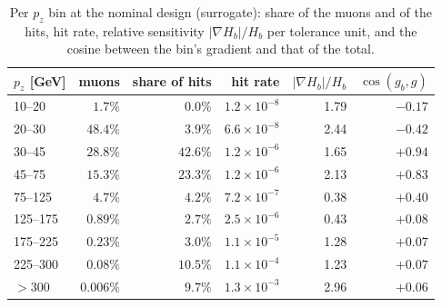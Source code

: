 \documentclass[11pt,a4paper]{article}
\begin{document}
\begin{table}[t]
\centering
\caption{Per $p_z$ bin at the nominal design (surrogate): share of the muons and of the hits, hit
rate, relative sensitivity $|\nabla H_b|/H_b$ per tolerance unit, and the cosine between the
bin's gradient and that of the total.}
\label{tab:pz}
\begin{tabular}{lrrrrr}
\toprule
$p_z$ [GeV] & muons & share of hits & hit rate & $|\nabla H_b|/H_b$ & $\cos(g_b, g)$ \\
\midrule
10--20   & $1.7\%$   & $0.0\%$  & $1.2\times10^{-8}$ & 1.79 & $-0.17$ \\
20--30   & $48.4\%$  & $3.9\%$  & $6.6\times10^{-8}$ & 2.44 & $-0.42$ \\
30--45   & $28.8\%$  & $42.6\%$ & $1.2\times10^{-6}$ & 1.65 & $+0.94$ \\
45--75   & $15.3\%$  & $23.3\%$ & $1.2\times10^{-6}$ & 2.13 & $+0.83$ \\
75--125  & $4.7\%$   & $4.2\%$  & $7.2\times10^{-7}$ & 0.38 & $+0.40$ \\
125--175 & $0.89\%$  & $2.7\%$  & $2.5\times10^{-6}$ & 0.43 & $+0.08$ \\
175--225 & $0.23\%$  & $3.0\%$  & $1.1\times10^{-5}$ & 1.28 & $+0.07$ \\
225--300 & $0.08\%$  & $10.5\%$ & $1.1\times10^{-4}$ & 1.23 & $+0.07$ \\
$>300$   & $0.006\%$ & $9.7\%$  & $1.3\times10^{-3}$ & 2.96 & $+0.06$ \\
\bottomrule
\end{tabular}
\end{table}
\end{document}
